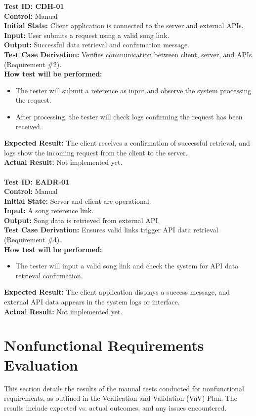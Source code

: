 \documentclass[12pt, titlepage]{article}
\begin{document}
\textbf{Test ID: CDH-01}\\
\textbf{Control:} Manual\\
\textbf{Initial State:} Client application is connected to the server and external APIs.\\
\textbf{Input:} User submits a request using a valid song link.\\
\textbf{Output:} Successful data retrieval and confirmation message.\\
\textbf{Test Case Derivation:} Verifies communication between client, server, and APIs (Requirement \#2).\\
\textbf{How test will be performed:}
\begin{itemize}
  \item The tester will submit a reference as input and observe the system processing the request.
  \item After processing, the tester will check logs confirming the request has been received.
\end{itemize}
\textbf{Expected Result:} The client receives a confirmation of successful retrieval, and logs show the incoming request from the client to the server.\\
\textbf{Actual Result:} Not implemented yet.\\[1em]
\\
\textbf{Test ID: EADR-01}\\
\textbf{Control:} Manual\\
\textbf{Initial State:} Server and client are operational.\\
\textbf{Input:} A song reference link.\\
\textbf{Output:} Song data is retrieved from external API.\\
\textbf{Test Case Derivation:} Ensures valid links trigger API data retrieval (Requirement \#4).\\
\textbf{How test will be performed:}
\begin{itemize}
  \item The tester will input a valid song link and check the system for API data retrieval confirmation.
\end{itemize}
\textbf{Expected Result:} The client application displays a success message, and external API data appears in the system logs or interface.\\
\textbf{Actual Result:} Not implemented yet.

\section{Nonfunctional Requirements Evaluation}
This section details the results of the manual tests conducted for nonfunctional
requirements, as outlined in the Verification and Validation (VnV) Plan. The
results include expected vs. actual outcomes, and any issues encountered.
\end{document}
